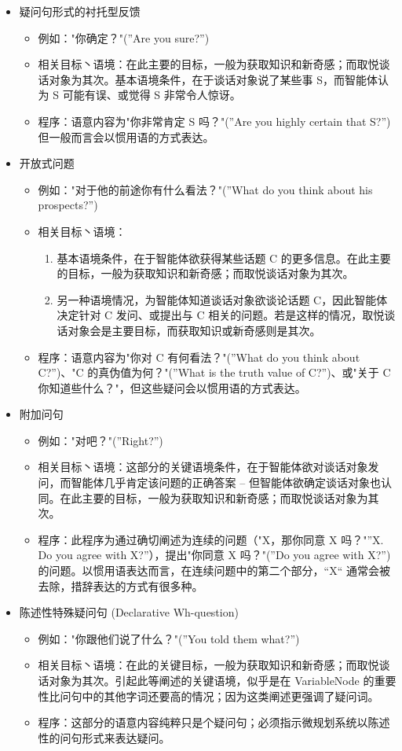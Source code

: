 \begin{itemize}
\item 疑问句形式的衬托型反馈
\begin{itemize}
\item 例如："你确定？"(”Are you sure?”)
\item 相关目标丶语境：在此主要的目标，一般为获取知识和新奇感；而取悦谈话对象为其次。基本语境条件，在于谈话对象说了某些事 S，而智能体认为 S 可能有误、或觉得 S 非常令人惊讶。
\item 程序：语意内容为"你非常肯定 S 吗？"(”Are you highly certain that S?”) 但一般而言会以惯用语的方式表达。
\end{itemize}


\item 开放式问题
\begin{itemize}
\item 例如："对于他的前途你有什么看法？"(”What do you think about his prospects?”)
\item 相关目标丶语境：
\begin{enumerate}
\item 基本语境条件，在于智能体欲获得某些话题 C 的更多信息。在此主要的目标，一般为获取知识和新奇感；而取悦谈话对象为其次。
\item 另一种语境情况，为智能体知道谈话对象欲谈论话题 C，因此智能体决定针对 C 发问、或提出与 C 相关的问题。若是这样的情况，取悦谈话对象会是主要目标，而获取知识或新奇感则是其次。 
\end{enumerate}
\item 程序：语意内容为"你对 C 有何看法？"(”What do you think about C?”)、"C 的真伪值为何？"(”What is the truth value of C?”)、或"关于 C 你知道些什么？"，但这些疑问会以惯用语的方式表达。
\end{itemize}


\item 附加问句
\begin{itemize}
\item 例如："对吧？"(”Right?”)
\item 相关目标丶语境：这部分的关键语境条件，在于智能体欲对谈话对象发问，而智能体几乎肯定该问题的正确答案 – 但智能体欲确定谈话对象也认同。在此主要的目标，一般为获取知识和新奇感；而取悦谈话对象为其次。 
\item 程序：此程序为通过确切阐述为连续的问题（"X，那你同意 X 吗？"”X. Do you agree with X?”），提出"你同意 X 吗？"(”Do you agree with X?”) 的问题。以惯用语表达而言，在连续问题中的第二个部分，“X“ 通常会被去除，措辞表达的方式有很多种。
\end{itemize}


\item 陈述性特殊疑问句 (Declarative Wh-question)
\begin{itemize}
\item 例如："你跟他们说了什么？"(”You told them what?”)
\item 相关目标丶语境：在此的关键目标，一般为获取知识和新奇感；而取悦谈话对象为其次。引起此等阐述的关键语境，似乎是在 VariableNode 的重要性比问句中的其他字词还要高的情况；因为这类阐述更强调了疑问词。
\item 程序：这部分的语意内容纯粹只是个疑问句；必须指示微规划系统以陈述性的问句形式来表达疑问。
\end{itemize}



\end{itemize}
